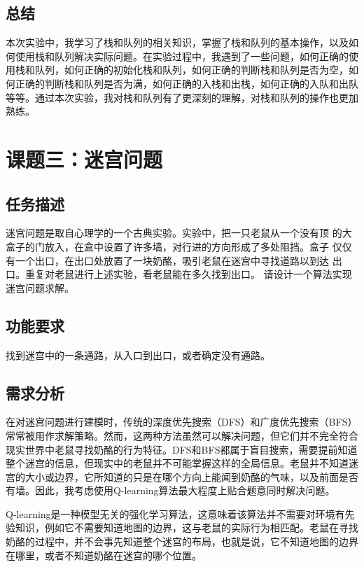 \documentclass[UTF8,titlepage]{ctexart}
\numberwithin{figure}{section}
\begin{document}
\subsection{总结}
本次实验中，我学习了栈和队列的相关知识，掌握了栈和队列的基本操作，以及如何使用栈和队列解决实际问题。在实验过程中，我遇到了一些问题，如何正确的使用栈和队列，如何正确的初始化栈和队列，如何正确的判断栈和队列是否为空，如何正确的判断栈和队列是否为满，如何正确的入栈和出栈，如何正确的入队和出队等等。通过本次实验，我对栈和队列有了更深刻的理解，对栈和队列的操作也更加熟练。

\clearpage
\section{课题三：迷宫问题}

\subsection{任务描述}
迷宫问题是取自心理学的一个古典实验。实验中，把一只老鼠从一个没有顶
的大盒子的门放入，在盒中设置了许多墙，对行进的方向形成了多处阻挡。盒子
仅仅有一个出口，在出口处放置了一块奶酪，吸引老鼠在迷宫中寻找道路以到达
出口。重复对老鼠进行上述实验，看老鼠能在多久找到出口。
请设计一个算法实现迷宫问题求解。

\subsection{功能要求}

找到迷宫中的一条通路，从入口到出口，或者确定没有通路。

\subsection{需求分析}
在对迷宫问题进行建模时，传统的深度优先搜索（DFS）和广度优先搜索（BFS）常常被用作求解策略。然而，这两种方法虽然可以解决问题，但它们并不完全符合现实世界中老鼠寻找奶酪的行为特征。DFS和BFS都属于盲目搜索，需要提前知道整个迷宫的信息，但现实中的老鼠并不可能掌握这样的全局信息。老鼠并不知道迷宫的大小或边界，它所知道的只是在哪个方向上能闻到奶酪的气味，以及前面是否有墙。因此，我考虑使用Q-learning算法最大程度上贴合题意同时解决问题。

Q-learning是一种模型无关的强化学习算法，这意味着该算法并不需要对环境有先验知识，例如它不需要知道地图的边界，这与老鼠的实际行为相匹配。老鼠在寻找奶酪的过程中，并不会事先知道整个迷宫的布局，也就是说，它不知道地图的边界在哪里，或者不知道奶酪在迷宫的哪个位置。
\end{document}
